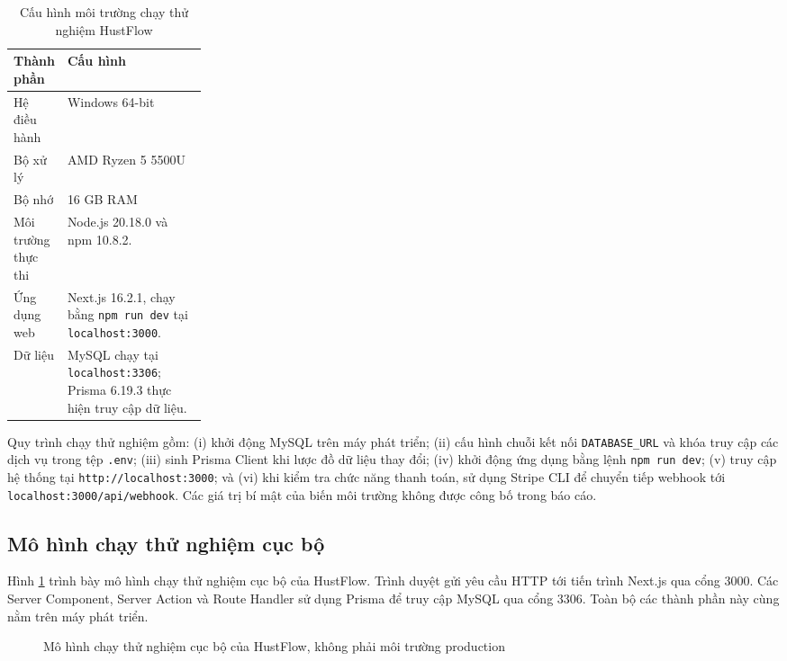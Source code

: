 \documentclass[../DoAn.tex]{subfiles}
\begin{document}
\begin{table}[H]
    \centering
    \caption{Cấu hình môi trường chạy thử nghiệm HustFlow}
    \label{table:chapter4_local_environment}
    \begin{tabularx}{\linewidth}{|p{0.25\linewidth}|X|}
        \hline
        \textbf{Thành phần} & \textbf{Cấu hình} \\ \hline
        Hệ điều hành & Windows 64-bit \\ \hline
        Bộ xử lý & AMD Ryzen 5 5500U\\ \hline
        Bộ nhớ & 16 GB RAM \\ \hline
        Môi trường thực thi & Node.js 20.18.0 và npm 10.8.2. \\ \hline
        Ứng dụng web & Next.js 16.2.1, chạy bằng \texttt{npm run dev} tại \texttt{localhost:3000}. \\ \hline
        Dữ liệu & MySQL chạy tại \texttt{localhost:3306}; Prisma 6.19.3 thực hiện truy cập dữ liệu. \\ \hline
    \end{tabularx}
\end{table}

Quy trình chạy thử nghiệm gồm: (i) khởi động MySQL trên máy phát triển; (ii) cấu hình chuỗi kết nối \texttt{DATABASE\_URL} và khóa truy cập các dịch vụ trong tệp \texttt{.env}; (iii) sinh Prisma Client khi lược đồ dữ liệu thay đổi; (iv) khởi động ứng dụng bằng lệnh \texttt{npm run dev}; (v) truy cập hệ thống tại \texttt{http://localhost:3000}; và (vi) khi kiểm tra chức năng thanh toán, sử dụng Stripe CLI để chuyển tiếp webhook tới \texttt{localhost:3000/api/webhook}. Các giá trị bí mật của biến môi trường không được công bố trong báo cáo.

\subsection{Mô hình chạy thử nghiệm cục bộ}
\label{subsection:4.5.2}

Hình \ref{fig:chapter4_local_deployment} trình bày mô hình chạy thử nghiệm cục bộ của HustFlow. Trình duyệt gửi yêu cầu HTTP tới tiến trình Next.js qua cổng 3000. Các Server Component, Server Action và Route Handler sử dụng Prisma để truy cập MySQL qua cổng 3306. Toàn bộ các thành phần này cùng nằm trên máy phát triển.

\begin{figure}[H]
    \centering
    \caption{Mô hình chạy thử nghiệm cục bộ của HustFlow, không phải môi trường production}
    \label{fig:chapter4_local_deployment}
\end{figure}
\end{document}
